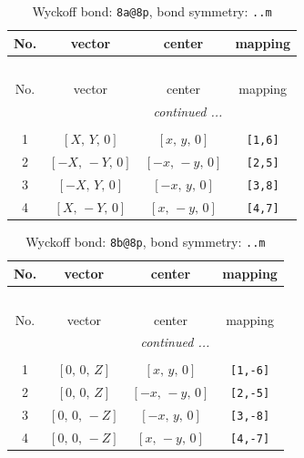 \documentclass[fleqn,8pt]{jsarticle}
\begin{document}
\begin{longtable}{cccc}
\caption{Wyckoff bond: {\tt 8a@8p}, bond symmetry: {\tt ..m}}
 \\
 \hline \hline
No. & vector & center & mapping \\ \hline \endfirsthead

\multicolumn{3}{l}{\tablename\ \thetable{}} \\
 \hline \hline
No. & vector & center & mapping \\ \hline \endhead

 \hline \hline
\multicolumn{3}{r}{\footnotesize\it continued ...} \\ \endfoot

 \hline \hline
\multicolumn{3}{r}{} \\ \endlastfoot

1 & $\left[ X,\, Y,\, 0 \right]$ & $\left[ x,\, y,\, 0 \right]$ & {\tt [1,6]} \\ \hline
2 & $\left[ - X,\, - Y,\, 0 \right]$ & $\left[ - x,\, - y,\, 0 \right]$ & {\tt [2,5]} \\ \hline
3 & $\left[ - X,\, Y,\, 0 \right]$ & $\left[ - x,\, y,\, 0 \right]$ & {\tt [3,8]} \\ \hline
4 & $\left[ X,\, - Y,\, 0 \right]$ & $\left[ x,\, - y,\, 0 \right]$ & {\tt [4,7]} \\
\end{longtable}
\renewcommand{\arraystretch}{1.2}
\begin{longtable}{cccc}
\caption{Wyckoff bond: {\tt 8b@8p}, bond symmetry: {\tt ..m}}
 \\
 \hline \hline
No. & vector & center & mapping \\ \hline \endfirsthead

\multicolumn{3}{l}{\tablename\ \thetable{}} \\
 \hline \hline
No. & vector & center & mapping \\ \hline \endhead

 \hline \hline
\multicolumn{3}{r}{\footnotesize\it continued ...} \\ \endfoot

 \hline \hline
\multicolumn{3}{r}{} \\ \endlastfoot

1 & $\left[ 0,\, 0,\, Z \right]$ & $\left[ x,\, y,\, 0 \right]$ & {\tt [1,-6]} \\ \hline
2 & $\left[ 0,\, 0,\, Z \right]$ & $\left[ - x,\, - y,\, 0 \right]$ & {\tt [2,-5]} \\ \hline
3 & $\left[ 0,\, 0,\, - Z \right]$ & $\left[ - x,\, y,\, 0 \right]$ & {\tt [3,-8]} \\ \hline
4 & $\left[ 0,\, 0,\, - Z \right]$ & $\left[ x,\, - y,\, 0 \right]$ & {\tt [4,-7]} \\
\end{longtable}
\end{document}
